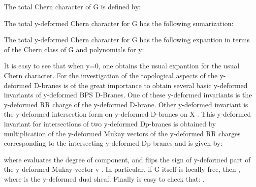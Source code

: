 \documentclass[a4paper,a4paper]{article}
\begin{document}
\begin{center}
{  \coordHE{} }
\end{center}
The total Chern character of G is defined by:
\begin{center}
{  \coordHE{} }
\end{center} 

The total y-deformed Chern character for G  has the following sumarization:

\begin{center}
{  \coordHE{} }
\end{center}
The total y-deformed Chern character for G has the following expantion in terms of the Chern class of G and polynomials for y:

\begin{center}
{  \coordHE{} }
\end{center}

It is easy to see that when y=0, one obtains the usual expantion for the usual Chern character.
For the investigation of the topological aspects of the y-deformed  D-branes is of the great importance to obtain several basic y-deformed invariants of y-deformed BPS D-Branes. One of these y-deformed invariants is the y-deformed RR charge of the y-deformed D-brane. Other y-deformed invariant is the y-deformed  intersection form on y-deformed D-branes on X . This y-deformed invariant for intersections of 
two y-deformed Dp-branes is obtained by multiplication of the y-deformed Mukay vectors of the y-deformed RR charges corresponding to the intersecting y-deformed Dp-branes and is given by: 
 
\begin{center}
\setlength{\baselineskip}{30pt}
{  \coordHE{} }
\end{center}

where \coordHE{}  evaluates the degree of \coordHE{} component, and \coordHE{} flips the sign of \coordHE{} y-deformed part of the y-deformed  Mukay vector v . In particular, if G itself is locally free, then \coordHE{}, where  \coordHE{} is the y-deformed dual sheaf. Finally is easy to check that: \coordHE{}.
\end{document}
